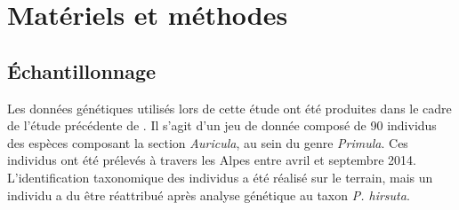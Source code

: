 
\section{Matériels et méthodes}

\subsection{Échantillonnage}

Les données génétiques utilisés lors de cette étude ont été produites dans le cadre de l'étude précédente de \citet{Boucher2016a}.
 Il s'agit d'un jeu de donnée composé de 90 individus des espèces composant la section \textit{Auricula}, au sein du genre \textit{Primula}.
 Ces individus ont été prélevés à travers les Alpes entre avril et septembre 2014.
 L'identification taxonomique des individus a été réalisé sur le terrain, mais un individu a du être réattribué après analyse génétique au taxon \textit{P. hirsuta}.

